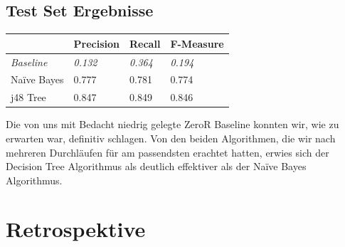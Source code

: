 \documentclass[]{article}
\begin{document}
\subsection{Test Set Ergebnisse}
\begin{table}[h]
\begin{tabular}{l|lll}
                  & Precision      & Recall         & F-Measure      \\ \hline
\textit{Baseline} & \textit{0.132} & \textit{0.364} & \textit{0.194} \\ \hline
Naïve Bayes       & 0.777          & 0.781          & 0.774          \\
j48 Tree          & 0.847      	   & 0.849            & 0.846          
\end{tabular}
\end{table}

Die von uns mit Bedacht niedrig gelegte ZeroR Baseline konnten wir, wie zu erwarten war, definitiv schlagen. Von den beiden Algorithmen, die wir nach mehreren Durchläufen für am passendsten erachtet hatten, erwies sich der Decision Tree Algorithmus als deutlich effektiver als der Naïve Bayes Algorithmus.



\section{Retrospektive}


\end{document}
